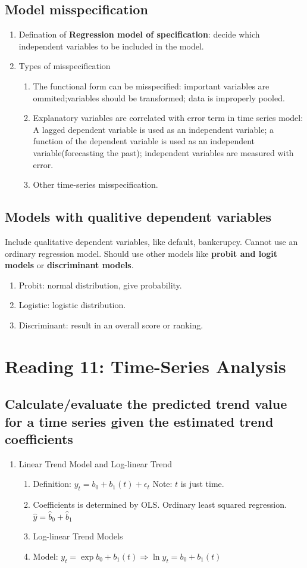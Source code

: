 \documentclass{article}
\newcommand{\be}{\begin{enumerate}}
\newcommand{\ee}{\end{enumerate}}
\begin{document}
\subsection{Model misspecification}
\begin{enumerate}
    \item Defination of {\bf Regression model of specification}: decide which independent variables
        to be included in the model.
    \item Types of misspecification
        \be
            \item The functional form can be misspecified:
                important variables are ommited;variables should be transformed; data is improperly pooled.
            \item Explanatory variables are correlated with error term in time series model:
                A lagged dependent variable is used as an independent variable; a function of the dependent
                variable is used as an independent variable(forecasting the past);
                independent variables are measured with error.
            \item Other time-series misspecification.
        \ee
\end{enumerate}
\subsection{Models with qualitive dependent variables}
Include qualitative dependent variables, like default, bankcrupcy. Cannot use an 
ordinary regression model. Should use other models like {\bf probit and logit models}
or {\bf discriminant models}.
\be
\item Probit: normal distribution, give probability.
\item Logistic: logistic distribution. 
\item Discriminant: result in an overall score or ranking.
\ee


\section{Reading 11: Time-Series Analysis}
\subsection{Calculate/evaluate the predicted trend value for a time series given 
the estimated trend coefficients}
\begin{enumerate}
    \item Linear Trend Model and Log-linear Trend
        \be
            \item Definition: $y_t=b_0+b_1(t)+\epsilon_t$ Note: $t$ is just time.
            \item Coefficients is determined by OLS. Ordinary least squared regression.
                \\$\hat{y}=\hat{b}_0+\hat{b}_1$
            \item Log-linear Trend Models
            \item Model: $y_t=\exp{b_0+b_1(t)}\Rightarrow \ln{y_t}=b_0+b_1(t)$
        \ee
\end{enumerate}
\end{document}
